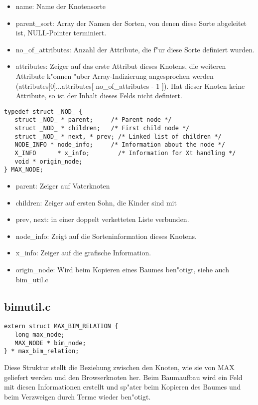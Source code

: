 \begin{itemize}
	\item name: Name der Knotensorte
	\item parent\_sort: Array der Namen der Sorten, von denen diese
	Sorte abgeleitet ist, NULL-Pointer terminiert.
	\item no\_of\_attributes: Anzahl der Attribute, die f"ur diese
	Sorte definiert wurden.
	\item attributes: Zeiger auf das erste Attribut dieses Knotens,
	die weiteren Attribute k"onnen "uber Array-Indizierung angesprochen
	werden (attributes[0]...attributes[ no\_of\_attributes - 1 ]). Hat
	dieser Knoten keine Attribute, so ist der Inhalt dieses Felds
	nicht definiert.
\end{itemize}
\begin{verbatim}
typedef struct _NOD_ {
   struct _NOD_ * parent;     /* Parent node */
   struct _NOD_ * children;   /* First child node */
   struct _NOD_ * next, * prev; /* Linked list of children */
   NODE_INFO * node_info;     /* Information about the node */
   X_INFO      * x_info;        /* Information for Xt handling */
   void * origin_node;
} MAX_NODE;

\end{verbatim}
\begin{itemize}
	\item parent: Zeiger auf Vaterknoten
	\item children: Zeiger auf ersten Sohn, die Kinder sind mit
	\item prev, next: in einer doppelt verketteten Liste verbunden.
	\item node\_info: Zeigt auf die Sorteninformation dieses Knotens.
	\item x\_info: Zeiger auf die grafische Information.
	\item origin\_node: Wird beim Kopieren eines Baumes ben"otigt,
	siehe auch bim\_util.c
\end{itemize}

\subsection{bimutil.c}
\begin{verbatim}
extern struct MAX_BIM_RELATION {
   long max_node;
   MAX_NODE * bim_node;
} * max_bim_relation; 
\end{verbatim}
Diese Struktur stellt die Beziehung zwischen den Knoten, wie sie
von MAX geliefert werden und den Browserknoten her. Beim Baumaufbau
wird ein Feld mit diesen Informationen erstellt und sp"ater
beim Kopieren des Baumes und beim Verzweigen durch Terme wieder
ben"otigt.\\

